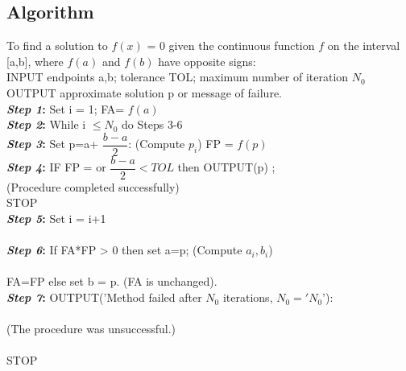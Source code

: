 \documentclass[12pt,a4paper]{article}
\begin{document}
\subsection{Algorithm} 
		
			To find a solution to \(f(x)\) = 0 given the continuous function \(f\) on the interval [a,b], where \(f(a)\) and \(f(b)\) have opposite signs:
			\\
			INPUT  endpoints a,b; tolerance TOL; maximum number of iteration $N_{0}$ \\
			OUTPUT  approximate solution p or message of failure.\\
			
			\textbf{\textit{Step 1}:}   Set i = 1; FA= \(f(a)\) \\
			
			\textbf{\textit{Step 2}:} While i $\leq N_{0}$ do Steps 3-6 \\
			
			\textbf{\textit{Step 3}:} Set p=a+ $\dfrac{b-a}{2}$: (Compute $p_{i}$) 
				FP = \(f(p)\)\\
			\textbf{\textit{Step 4}:} IF FP =  or $ \dfrac{b-a}{2} < TOL$ then OUTPUT(p) ;\\
			 	\hspace{1in}(Procedure completed successfully)\\
			\hspace{0.5cm}	STOP\\
			
			\textbf{\textit{Step 5}:} Set i = i+1\\ \\
			
			\textbf{\textit{Step 6}:} If FA*FP > 0 then set a=p; (Compute $a_{i},b_{i}$)\\\\
			\hspace{1.5cm} FA=FP
			\hspace{1cm} else set b = p. (FA is unchanged).\\
			
			
			
			\textbf{\textit{Step 7}:}  OUTPUT('Method failed after $N_{0}$ iterations, $N_{0}='N_{0}$'):\\\\
			\hspace{1.5cm}(The procedure was unsuccessful.)\\\\
			\hspace{0.5cm}STOP
			\newpage
		
\end{document}
